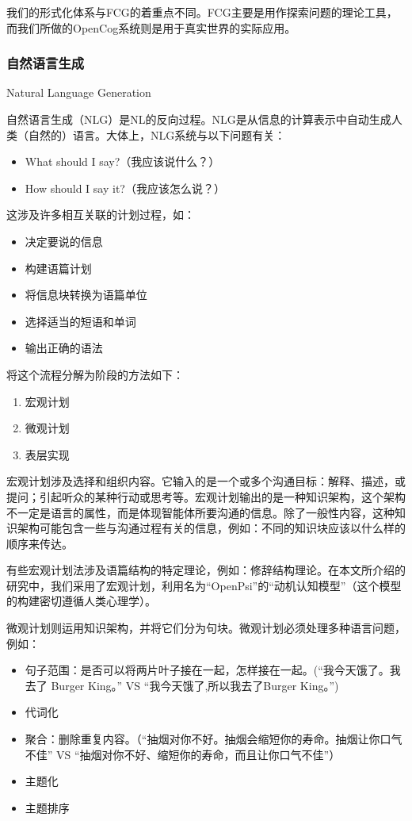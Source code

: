\begin{enumerate}
我们的形式化体系与FCG的着重点不同。FCG主要是用作探索问题的理论工具，而我们所做的OpenCog系统则是用于真实世界的实际应用。

\subsubsection{自然语言生成}{Natural Language Generation}

自然语言生成（NLG）是NL的反向过程。NLG是从信息的计算表示中自动生成人类（自然的）语言。大体上，NLG系统与以下问题有关：

\begin{itemize}
\item What should I say?（我应该说什么？）
\item How should I say it?（我应该怎么说？）
\end{itemize}

这涉及许多相互关联的计划过程，如：
\begin{itemize}
\item 决定要说的信息
\item 构建语篇计划
\item 将信息块转换为语篇单位
\item 选择适当的短语和单词
\item 输出正确的语法
\end{itemize}

将这个流程分解为阶段的方法如下：
\begin{enumerate}
\item 宏观计划
\item 微观计划
\item 表层实现
\end{enumerate}

宏观计划涉及选择和组织内容。它输入的是一个或多个沟通目标：解释、描述，或提问；引起听众的某种行动或思考等。宏观计划输出的是一种知识架构，这个架构不一定是语言的属性，而是体现智能体所要沟通的信息。除了一般性内容，这种知识架构可能包含一些与沟通过程有关的信息，例如：不同的知识块应该以什么样的顺序来传达。

有些宏观计划法涉及语篇结构的特定理论，例如：修辞结构理论\cite{Mann1987}。在本文所介绍的研究中，我们采用了宏观计划，利用名为“OpenPsi”的“动机认知模型”（这个模型的构建密切遵循人类心理学）。

微观计划则运用知识架构，并将它们分为句块。微观计划必须处理多种语言问题，例如：

\begin{itemize}
\item 句子范围：是否可以将两片叶子接在一起，怎样接在一起。(“我今天饿了。我去了 Burger King。” VS “我今天饿了,所以我去了Burger King。”)
\item 代词化
\item 聚合：删除重复内容。（“抽烟对你不好。抽烟会缩短你的寿命。抽烟让你口气不佳” VS “抽烟对你不好、缩短你的寿命，而且让你口气不佳”）
\item 主题化
\item 主题排序
\end{itemize}


\end{enumerate}
